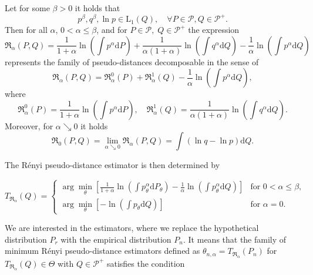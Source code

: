{\begin{theorem}
Let for some $\beta>0$ it holds that
	\begin{equation*}
			p^\beta, q^\beta,\ln{p} \in \mathrm{L}_1(Q), \quad \forall P \in \mathcal{P}, Q \in \mathcal{P^+}.
	\end{equation*}
	Then for all $\alpha$, $0 < \alpha \leq \beta$, and for $P \in \mathcal{P}, \; Q \in \mathcal{P^+} $ the expression
	\begin{equation}
		\mathfrak{R}_\alpha (P,Q) = \dfrac{1}{1+\alpha}\ln{\left( \int{p^\alpha \mathrm{d}P } \right)} +
		\dfrac{1}{\alpha (1+\alpha)}\ln{\left( \int{q^\alpha \mathrm{d}Q } \right)} -
		\dfrac{1}{\alpha} \ln{\left( \int{p^\alpha \mathrm{d}Q } \right)}
	\end{equation}
		represents the family of pseudo-distances decomposable in the sense of
	\begin{equation*}
		\mathfrak{R}_\alpha (P,Q) = \mathfrak{R}_\alpha^0 (P) + \mathfrak{R}_\alpha^1 (Q) - \dfrac{1}{\alpha} \ln{\left( \int{p^\alpha \mathrm{d}Q } \right)},
	\end{equation*}	
	where
	\begin{equation*}
		\mathfrak{R}_\alpha^0 (P) = \dfrac{1}{1+\alpha}\ln{\left( \int{p^\alpha \mathrm{d}P } \right)}, \quad \mathfrak{R}_\alpha^1 (Q) = \dfrac{1}{\alpha (1+\alpha)}\ln{\left( \int{q^\alpha \mathrm{d}Q } \right)}.
	\end{equation*}
	Moreover, for $\alpha \searrow 0$ it holds
	\begin{equation*}
		\mathfrak{R}_0 (P,Q) = \lim_{\alpha \searrow 0} \mathfrak{R}_\alpha (P,Q) =  \int{\left( \ln{q} - \ln{p} \right)\mathrm{d}Q}.
	\end{equation*}
\end{theorem}

\noindent The R\'{e}nyi pseudo-distance estimator is then determined by

\begin{equation}
	T_{\mathfrak{R}_\alpha}(Q) =
	\begin{cases}
		 \arg \min_{\theta} \left[\frac{1}{1+\alpha} \ln(\int p_\theta^\alpha\mathrm{d}P_\theta) - \frac{1}{\alpha} \ln(\int p_\theta^\alpha\mathrm{d}Q) \right] & \text{for } 0 < \alpha \leq \beta, \\
		 \arg \min_{\theta} \left[- \ln(\int p_\theta\mathrm{d}Q) \right] & \text{for } \alpha = 0.
	\end{cases}	
\end{equation}

We are interested in the estimators, where we replace the hypothetical distribution $P_r$ with the empirical distribution $P_n$. It means that the family of minimum R\'{e}nyi pseudo-distance estimators defined as $\theta_{n,\alpha} = T_{\mathfrak{R}_\alpha}(P_n)$ for $T_{\mathfrak{R}_\alpha}(Q) \in \Theta$ with $Q \in \mathcal{P}^+$ satisfies the condition

}
